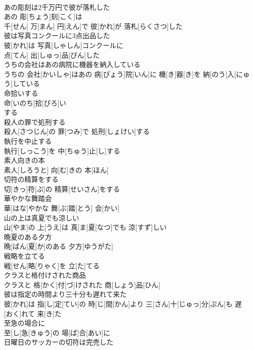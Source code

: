 \documentclass[8pt]{extreport}
\begin{document}
\begin{CJK}{UTF8}{min}
\\	あの彫刻は2千万円で彼が落札した	
\\	あの 彫[ちょう]刻[こく]は 
\\	千[せん] 万[まん] 円[えん]で 彼[かれ]が 落札[らくさつ]した
\\	彼は写真コンクールに3点出品した	
\\	彼[かれ]は 写真[しゃしん]コンクールに 
\\	点[てん] 出[しゅっ]品[ぴん]した
\\	うちの会社はあの病院に機器を納入している	
\\	うちの 会社[かいしゃ]はあの 病[びょう]院[いん]に 機[き]器[き]を 納[のう]入[にゅう]している
\\	命拾いする	
\\	命[いのち]拾[びろ]い 
\\	する
\\	殺人の罪で処刑する	
\\	殺人[さつじん]の 罪[つみ]で 処刑[しょけい]する
\\	執行を中止する	
\\	執行[しっこう]を 中[ちゅう]止[し]する
\\	素人向きの本	
\\	素人[しろうと] 向[む]きの 本[ほん]
\\	切符の精算をする	
\\	切[きっ]符[ぷ]の 精算[せいさん]をする
\\	華やかな舞踏会	
\\	華[はな]やかな 舞[ぶ]踏[とう] 会[かい]
\\	山の上は真夏でも涼しい	
\\	山[やま]の 上[うえ]は 真[ま]夏[なつ]でも 涼[すず]しい
\\	晩夏のある夕方	
\\	晩[ばん]夏[か]のある 夕方[ゆうがた]
\\	戦略を立てる	
\\	戦[せん]略[りゃく]を 立[た]てる
\\	クラスと格付けされた商品	
\\	クラスと 格[かく]付[づ]けされた 商[しょう]品[ひん]
\\	彼は指定の時間より三十分も遅れて来た	
\\	彼[かれ]は 指[し]定[てい]の 時[じ]間[かん]より 三[さん]十[じゅっ]分[ぷん]も 遅[おく]れて 来[き]た
\\	至急の場合に	
\\	至[し]急[きゅう]の 場[ば]合[あい]に
\\	日曜日のサッカーの切符は完売した	

\end{CJK}
\end{document}
